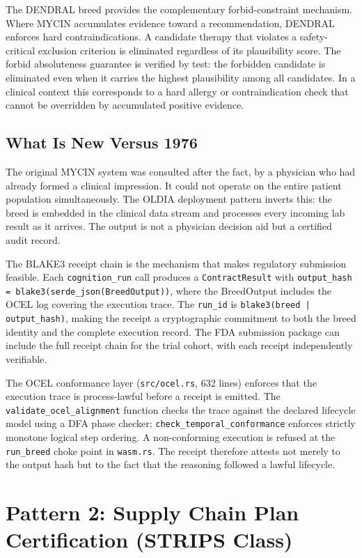 The DENDRAL breed provides the complementary forbid-constraint mechanism. Where
MYCIN accumulates evidence toward a recommendation, DENDRAL enforces hard
contraindications. A candidate therapy that violates a safety-critical exclusion
criterion is eliminated regardless of its plausibility score. The forbid absoluteness
guarantee is verified by test: the forbidden candidate is eliminated even when it
carries the highest plausibility among all candidates. In a clinical context this
corresponds to a hard allergy or contraindication check that cannot be overridden
by accumulated positive evidence.

\subsection*{What Is New Versus 1976}

The original MYCIN system was consulted after the fact, by a physician who had
already formed a clinical impression. It could not operate on the entire patient
population simultaneously. The OLDIA deployment pattern inverts this: the breed
is embedded in the clinical data stream and processes every incoming lab result
as it arrives. The output is not a physician decision aid but a certified audit
record.

The BLAKE3 receipt chain is the mechanism that makes regulatory submission feasible.
Each \texttt{cognition\_run} call produces a \texttt{ContractResult} with
\texttt{output\_hash = blake3(serde\_json(BreedOutput))}, where the BreedOutput
includes the OCEL log covering the execution trace. The \texttt{run\_id} is
\texttt{blake3(breed | output\_hash)}, making the receipt a cryptographic commitment
to both the breed identity and the complete execution record. The FDA submission
package can include the full receipt chain for the trial cohort, with each receipt
independently verifiable.

The OCEL conformance layer (\texttt{src/ocel.rs}, 632 lines) enforces that the
execution trace is process-lawful before a receipt is emitted. The
\texttt{validate\_ocel\_alignment} function checks the trace against the declared
lifecycle model using a DFA phase checker; \texttt{check\_temporal\_conformance}
enforces strictly monotone logical step ordering. A non-conforming execution is
refused at the \texttt{run\_breed} choke point in \texttt{wasm.rs}. The receipt
therefore attests not merely to the output hash but to the fact that the reasoning
followed a lawful lifecycle.

\section{Pattern 2: Supply Chain Plan Certification (STRIPS Class)}
\label{sec:strips-deployment}

